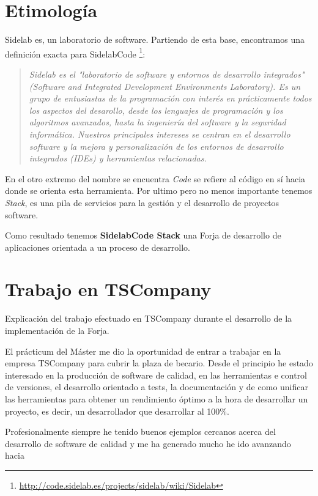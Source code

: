 \section{Etimolog\'ia}
\label{sec:etimologia}

\par Sidelab es, un laboratorio de software. Partiendo de esta base, encontramos una definici\'on exacta para SidelabCode \footnote{\url{http://code.sidelab.es/projects/sidelab/wiki/Sidelab}}:

\begin{quotation}
        \emph{Sidelab es el "laboratorio de software y entornos de desarrollo integrados" (Software and Integrated Development Environments Laboratory). Es un grupo de entusiastas de la programaci\'on con inter\'es en pr\'acticamente todos los aspectos del desarollo, desde los lenguajes de programaci\'on y los algoritmos avanzados, hasta la ingenier\'ia del software y la seguridad inform\'atica. Nuestros principales intereses se centran en el desarrollo software y la mejora y personalizaci\'on de los entornos de desarrollo integrados (IDEs) y herramientas relacionadas.}
\end{quotation}

\par En el otro extremo del nombre se encuentra \emph{Code} se refiere al c\'odigo en s\'i hacia donde se orienta esta herramienta. Por ultimo pero no menos importante tenemos \emph{Stack}, es una pila de servicios para la gesti\'on y el desarrollo de proyectos software.

\par Como resultado tenemos \textbf{SidelabCode Stack} una Forja de desarrollo de aplicaciones orientada a un proceso de desarrollo.


\section{Trabajo en TSCompany}
\label{sec:trabajo-tscompany}

\par Explicaci\'on del trabajo efectuado en TSCompany durante el desarrollo de la implementaci\'on de la Forja.

\par El pr\'acticum del M\'aster me dio la oportunidad de entrar a trabajar en la empresa TSCompany para cubrir la plaza de becario. Desde el principio he estado interesado en la producción de software de calidad, en las herramientas e control de versiones, el desarrollo orientado a tests, la documentación y de como unificar las herramientas para obtener un rendimiento óptimo a la hora de desarrollar un proyecto, es decir, un desarrollador que desarrollar al 100\%.

\par Profesionalmente siempre he tenido buenos ejemplos cercanos acerca del desarrollo de software de calidad y me ha generado mucho he ido avanzando hacia 

